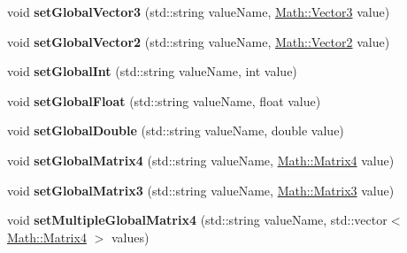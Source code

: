 \begin{DoxyCompactItemize}
\item 
\hypertarget{classBrickware_1_1Graphics_1_1Shader_aa1013509891749cc67a07d5a6d903434}{}void {\bfseries set\+Global\+Vector3} (std\+::string value\+Name, \hyperlink{classBrickware_1_1Math_1_1Vector3}{Math\+::\+Vector3} value)\label{classBrickware_1_1Graphics_1_1Shader_aa1013509891749cc67a07d5a6d903434}

\item 
\hypertarget{classBrickware_1_1Graphics_1_1Shader_adaa977f33ee396815759c8fed8ea12f0}{}void {\bfseries set\+Global\+Vector2} (std\+::string value\+Name, \hyperlink{classBrickware_1_1Math_1_1Vector2}{Math\+::\+Vector2} value)\label{classBrickware_1_1Graphics_1_1Shader_adaa977f33ee396815759c8fed8ea12f0}

\item 
\hypertarget{classBrickware_1_1Graphics_1_1Shader_a35a9f6ed5069c47f468a5d0fe46123a1}{}void {\bfseries set\+Global\+Int} (std\+::string value\+Name, int value)\label{classBrickware_1_1Graphics_1_1Shader_a35a9f6ed5069c47f468a5d0fe46123a1}

\item 
\hypertarget{classBrickware_1_1Graphics_1_1Shader_a4b2d2659345913e81b8eb936e9a5cc55}{}void {\bfseries set\+Global\+Float} (std\+::string value\+Name, float value)\label{classBrickware_1_1Graphics_1_1Shader_a4b2d2659345913e81b8eb936e9a5cc55}

\item 
\hypertarget{classBrickware_1_1Graphics_1_1Shader_a424f2fa6dd0c5d907cdf264c967f4cd4}{}void {\bfseries set\+Global\+Double} (std\+::string value\+Name, double value)\label{classBrickware_1_1Graphics_1_1Shader_a424f2fa6dd0c5d907cdf264c967f4cd4}

\item 
\hypertarget{classBrickware_1_1Graphics_1_1Shader_acc0d9b18d278c7a71d1db5ccf1543fbe}{}void {\bfseries set\+Global\+Matrix4} (std\+::string value\+Name, \hyperlink{classBrickware_1_1Math_1_1Matrix4}{Math\+::\+Matrix4} value)\label{classBrickware_1_1Graphics_1_1Shader_acc0d9b18d278c7a71d1db5ccf1543fbe}

\item 
\hypertarget{classBrickware_1_1Graphics_1_1Shader_ab023f95b563f164b9ba9df1372b82ea2}{}void {\bfseries set\+Global\+Matrix3} (std\+::string value\+Name, \hyperlink{classBrickware_1_1Math_1_1Matrix3}{Math\+::\+Matrix3} value)\label{classBrickware_1_1Graphics_1_1Shader_ab023f95b563f164b9ba9df1372b82ea2}

\item 
\hypertarget{classBrickware_1_1Graphics_1_1Shader_a1b32ed0c162dca831d9b7b96609fff7a}{}void {\bfseries set\+Multiple\+Global\+Matrix4} (std\+::string value\+Name, std\+::vector$<$ \hyperlink{classBrickware_1_1Math_1_1Matrix4}{Math\+::\+Matrix4} $>$ values)\label{classBrickware_1_1Graphics_1_1Shader_a1b32ed0c162dca831d9b7b96609fff7a}


\end{DoxyCompactItemize}
